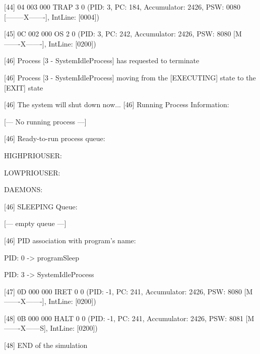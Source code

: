 [\textcolor{termred}{44}] {04 003 000} TRAP 3 0 (PID: \textcolor{termgreen}{3}, PC: \textcolor{termred}{184}, Accumulator: \textcolor{termred}{2426}, PSW: \textcolor{termred}{0080} [\textcolor{termred}{--------X-------}], IntLine: [\textcolor{termred}{0004}])

[\textcolor{termred}{45}] {0C 002 000} OS 2 0 (PID: \textcolor{termgreen}{3}, PC: \textcolor{termred}{242}, Accumulator: \textcolor{termred}{2426}, PSW: \textcolor{termred}{8080} [\textcolor{termred}{M-------X-------}], IntLine: [\textcolor{termred}{0200}])

	[\textcolor{termred}{46}] \textcolor{termred}{Process [3 - SystemIdleProcess] has requested to terminate}

	[\textcolor{termred}{46}] Process [\textcolor{termgreen}{3} - \textcolor{termgreen}{SystemIdleProcess}] moving from the [\textcolor{termgreen}{EXECUTING}] state to the [\textcolor{termgreen}{EXIT}] state

[\textcolor{termred}{46}] \textcolor{termred}{The system will shut down now...
}	[\textcolor{termred}{46}] Running Process Information:

		[--- No running process ---]

	[\textcolor{termred}{46}] Ready-to-run process queue:

 		HIGHPRIOUSER: 

		LOWPRIOUSER: 

		DAEMONS: 

	[\textcolor{termred}{46}] SLEEPING Queue:

		[--- empty queue ---]

	[\textcolor{termred}{46}] PID association with program's name:

		PID: \textcolor{termgreen}{0} -> programSleep

		PID: \textcolor{termgreen}{3} -> SystemIdleProcess

[\textcolor{termred}{47}] {0D 000 000} IRET 0 0 (PID: \textcolor{termgreen}{-1}, PC: \textcolor{termred}{241}, Accumulator: \textcolor{termred}{2426}, PSW: \textcolor{termred}{8080} [\textcolor{termred}{M-------X-------}], IntLine: [\textcolor{termred}{0200}])

[\textcolor{termred}{48}] {0B 000 000} HALT 0 0 (PID: \textcolor{termgreen}{-1}, PC: \textcolor{termred}{241}, Accumulator: \textcolor{termred}{2426}, PSW: \textcolor{termred}{8081} [\textcolor{termred}{M-------X------S}], IntLine: [\textcolor{termred}{0200}])

[\textcolor{termred}{48}] \textcolor{termred}{END of the simulation
}

